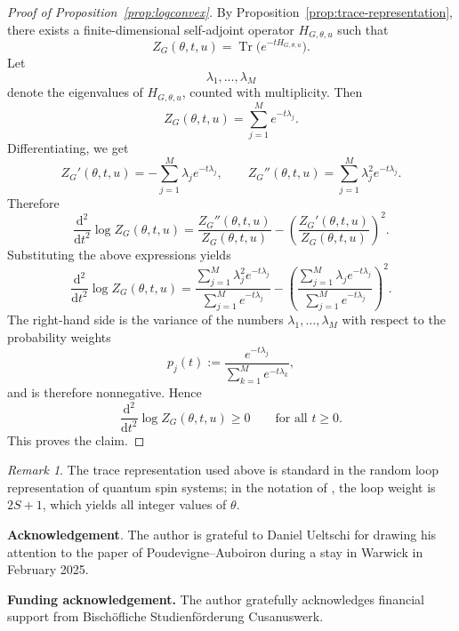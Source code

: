 \documentclass[11pt]{article}
\theoremstyle{remark}
\newtheorem{remark}[theorem]{Remark}
\theoremstyle{plain}
\newcommand{\1}{\mathbbm{1}}
\newcommand{\dd}{\mathrm{d}}
\begin{document}
\begin{proof}[Proof of Proposition~\ref{prop:logconvex}]
By Proposition~\ref{prop:trace-representation}, there exists a finite-dimensional self-adjoint operator \(H_{G,\theta,u}\) such that
\[
Z_G(\theta,t,u)=\operatorname{Tr}\bigl(e^{-tH_{G,\theta,u}}\bigr).
\]
Let
\[
\lambda_1,\dots,\lambda_M
\]
denote the eigenvalues of \(H_{G,\theta,u}\), counted with multiplicity. Then
\[
Z_G(\theta,t,u)=\sum_{j=1}^M e^{-t\lambda_j}.
\]
Differentiating, we get
\[
Z_G'(\theta,t,u)=-\sum_{j=1}^M \lambda_j e^{-t\lambda_j},
\qquad
Z_G''(\theta,t,u)=\sum_{j=1}^M \lambda_j^2 e^{-t\lambda_j}.
\]
Therefore
\[
\frac{\dd^2}{\dd t^2}\log Z_G(\theta,t,u)
=
\frac{Z_G''(\theta,t,u)}{Z_G(\theta,t,u)}
-
\left(\frac{Z_G'(\theta,t,u)}{Z_G(\theta,t,u)}\right)^2.
\]
Substituting the above expressions yields
\[
\frac{\dd^2}{\dd t^2}\log Z_G(\theta,t,u)
=
\frac{\sum_{j=1}^M \lambda_j^2 e^{-t\lambda_j}}{\sum_{j=1}^M e^{-t\lambda_j}}
-
\left(
\frac{\sum_{j=1}^M \lambda_j e^{-t\lambda_j}}{\sum_{j=1}^M e^{-t\lambda_j}}
\right)^2.
\]
The right-hand side is the variance of the numbers \(\lambda_1,\dots,\lambda_M\) with respect to the probability weights
\[
p_j(t):=\frac{e^{-t\lambda_j}}{\sum_{k=1}^M e^{-t\lambda_k}},
\]
and is therefore nonnegative. Hence
\[
\frac{\dd^2}{\dd t^2}\log Z_G(\theta,t,u)\ge 0
\qquad\text{for all }t\ge 0.
\]
This proves the claim.
\end{proof}

\begin{remark}
The trace representation used above is standard in the random loop representation of quantum spin systems; in the notation of \cite{Ueltschi2013}, the loop weight is \(2S+1\), which yields all integer values of \(\theta\).
\end{remark}

\noindent\textbf{\large Acknowledgement}. The author is grateful to Daniel Ueltschi for drawing his attention to the paper of Poudevigne--Auboiron during a stay in Warwick in February 2025.

\medskip

\noindent\textbf{Funding acknowledgement.} The author gratefully acknowledges financial support from Bischöfliche Studienförderung Cusanuswerk.



\end{document}
